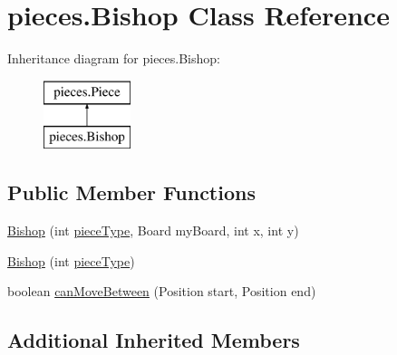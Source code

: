 \hypertarget{classpieces_1_1_bishop}{\section{pieces.\-Bishop Class Reference}
\label{classpieces_1_1_bishop}
}
Inheritance diagram for pieces.\-Bishop\-:\begin{figure}[H]
\begin{center}
\leavevmode
\includegraphics[height=2.000000cm]{classpieces_1_1_bishop}
\end{center}
\end{figure}
\subsection*{Public Member Functions}
\begin{DoxyCompactItemize}
\item 
\hyperlink{classpieces_1_1_bishop_ac46981a34fe380a8952fd19f6b96cd05}{Bishop} (int \hyperlink{classpieces_1_1_piece_ae40d6201d0aed36f369dd9d8f55892e3}{piece\-Type}, Board my\-Board, int x, int y)
\item 
\hyperlink{classpieces_1_1_bishop_ae5daf6af5a433314ec8bbe89d826a259}{Bishop} (int \hyperlink{classpieces_1_1_piece_ae40d6201d0aed36f369dd9d8f55892e3}{piece\-Type})
\item 
boolean \hyperlink{classpieces_1_1_bishop_a5222a9b4dc9cbe20a79234f7b3733124}{can\-Move\-Between} (Position start, Position end)
\end{DoxyCompactItemize}
\subsection*{Additional Inherited Members}


